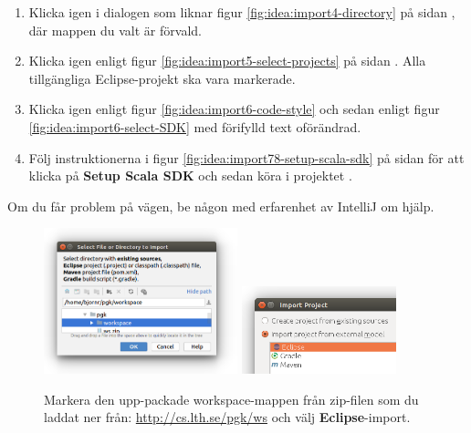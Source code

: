 \begin{enumerate}
\item Klicka  igen i dialogen som liknar figur \ref{fig:idea:import4-directory} på sidan \pageref{fig:idea:import4-directory}, där mappen du valt är förvald.

\item Klicka  igen enligt figur \ref{fig:idea:import5-select-projects} på sidan  \pageref{fig:idea:import5-select-projects}. Alla tillgängliga Eclipse-projekt ska vara markerade.

\item Klicka  igen enligt figur \ref{fig:idea:import6-code-style} och sedan   enligt figur \ref{fig:idea:import6-select-SDK} med förifylld text oförändrad.

\item Följ instruktionerna i figur \ref{fig:idea:import78-setup-scala-sdk} på sidan \pageref{fig:idea:import78-setup-scala-sdk} för att klicka på \textbf{Setup Scala SDK} och sedan köra  i projektet .

\end{enumerate}

\noindent Om du får problem på vägen, be någon med erfarenhet av IntelliJ om hjälp.


\begin{figure}[h]
\centering
\includegraphics[width=0.5\textwidth]{../img/intellij/idea-import2-select.png}%
\hfill\includegraphics[width=0.4\textwidth]{../img/intellij/idea-import3-eclipse.png}

\caption{Markera den upp-packade workspace-mappen från zip-filen som du laddat ner från: \url{http://cs.lth.se/pgk/ws} och välj \textbf{Eclipse}-import.}
\label{fig:idea:import23-select}
\end{figure}

